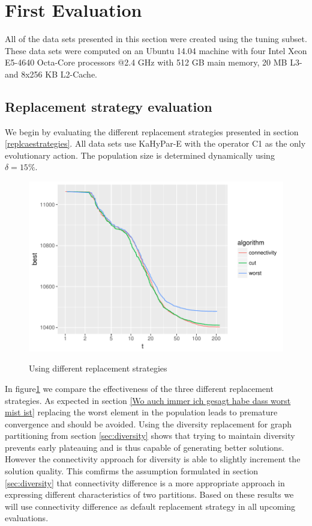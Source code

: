 \documentclass[a4paper,12pt,titlepage, BCOR7mm,headsepline]{scrbook}
\numberwithin{equation}{section}
\begin{document}
\section{First Evaluation} 
All of the data sets presented in this section were created using the tuning subset. These data sets were computed on an Ubuntu 14.04 machine with four Intel Xeon E5-4640 Octa-Core processors @2.4 GHz with 512 GB main memory, 20 MB L3- and 8x256 KB L2-Cache.
\subsection{Replacement strategy evaluation}
We begin by evaluating the different replacement strategies presented in section \ref{replcaestrategies}. All data sets use KaHyPar-E with the operator C1 as the only evolutionary action. The population size is determined dynamically using $\delta = 15\%$. 
\begin{figure}[H]
\caption{Using different replacement strategies}

\begin{center}
\includegraphics{bachelorarbeit-replacestrategies}\label{fig:replacement}
\end{center}

\end{figure}
In figure\ref{fig:replacement} we compare the effectiveness of the three different replacement strategies. As expected in section \ref{Wo auch immer ich gesagt habe dass worst mist ist} replacing the worst element in the population leads to premature convergence and should be avoided. Using the diversity replacement for graph partitioning \cite{sanders2012distributed} from section \ref{sec:diversity} shows that trying to maintain diversity prevents early plateauing and is thus capable of generating better solutions. However the connectivity approach for diversity is able to slightly increment the solution quality. This comfirms the assumption formulated in section \ref{sec:diversity} that connectivity difference is a more appropriate approach in expressing different characteristics of two partitions. Based on these results we will use connectivity difference as default replacement strategy in all upcoming evaluations.
\end{document}

